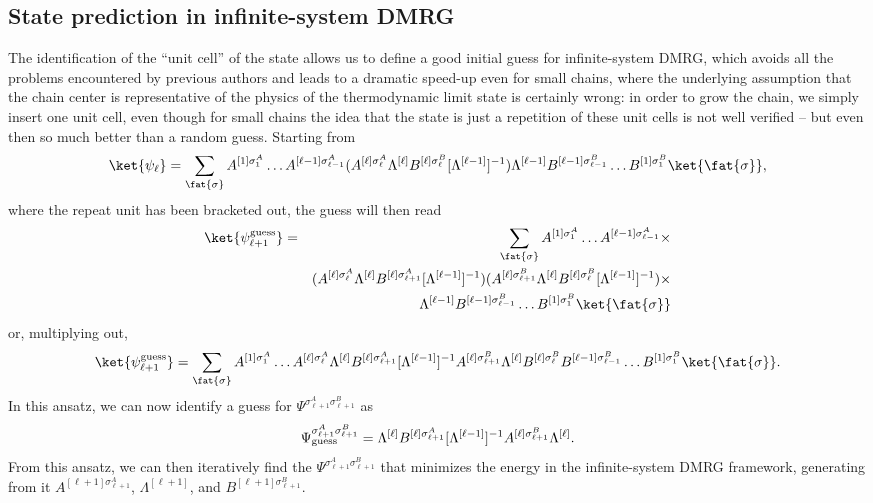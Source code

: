 \subsection{State prediction in infinite-system DMRG} 
The identification of the ``unit cell'' of the state allows us to define a good initial guess for infinite-system DMRG\cite{McCulloch08}, which avoids all the problems encountered by previous authors and leads to a dramatic speed-up even for small chains, where the underlying assumption that the chain center is representative of the physics of the thermodynamic limit state is certainly wrong: in order to grow the chain, we simply insert one unit cell, even though for small chains the idea that the state is just a repetition of these unit cells is not well verified -- but even then so much better than a random guess. Starting from
\begin{equation}
\ket{\psi_{\ell}} =  \sum_{\fat{\sigma}} A^{[1]\sigma_1^A} \ldots A^{[\ell-1]\sigma_{\ell-1}^A} (A^{[\ell]\sigma_\ell^A} \Lambda^{[\ell]} B^{[\ell]\sigma_\ell^B} [\Lambda^{[\ell-1]}]^{-1}) \Lambda^{[\ell-1]} B^{[\ell-1]\sigma_{\ell-1}^B} \ldots B^{[1]\sigma_1^B} \ket{\fat{\sigma}},
\end{equation} 
where the repeat unit has been bracketed out, the guess will then read
\begin{eqnarray}
\ket{\psi_{\ell+1}^{{\rm guess}}} &=& \sum_{\fat{\sigma}} A^{[1]\sigma_1^A} \ldots  A^{[\ell-1]\sigma_{\ell-1}^A} \times \nonumber \\
& & ( A^{[\ell]\sigma_\ell^A} \Lambda^{[\ell]} B^{[\ell]\sigma_{\ell+1}^A} [\Lambda^{[\ell-1]}]^{-1} ) (A^{[\ell]\sigma_{\ell+1}^B} \Lambda^{[\ell]} B^{[\ell]\sigma_\ell^B}  
[\Lambda^{[\ell-1]}]^{-1} ) \times \nonumber \\
& &  \Lambda^{[\ell-1]} B^{[\ell-1]\sigma_{\ell-1}^B} \ldots B^{[1]\sigma_1^B} \ket{\fat{\sigma}} 
\end{eqnarray}
or, multiplying out, 
\begin{equation}
\ket{\psi_{\ell+1}^{{\rm guess}}} = \sum_{\fat{\sigma}} A^{[1]\sigma_1^A} \ldots A^{[\ell]\sigma_\ell^A} \Lambda^{[\ell]} B^{[\ell]\sigma_{\ell+1}^A} [\Lambda^{[\ell-1]}]^{-1} A^{[\ell]\sigma_{\ell+1}^B} \Lambda^{[\ell]} B^{[\ell]\sigma_\ell^B} B^{[\ell-1]\sigma_{\ell-1}^B} \ldots B^{[1]\sigma_1^B} \ket{\fat{\sigma}} .
\end{equation}
In this ansatz, we can now identify a guess for $\Psi^{\sigma_{\ell+1}^A\sigma_{\ell+1}^B}$ as
\begin{equation}
\Psi^{\sigma_{\ell+1}^A\sigma_{\ell+1}^B}_{{\rm guess}} =
\Lambda^{[\ell]} B^{[\ell]\sigma_{\ell+1}^A} [\Lambda^{[\ell-1]}]^{-1} A^{[\ell]\sigma_{\ell+1}^B} \Lambda^{[\ell]} .
\label{eq:guess2sites}
\end{equation}
From this ansatz, we can then iteratively find the $\Psi^{\sigma_{\ell+1}^A\sigma_{\ell+1}^B}$ that minimizes the energy in the infinite-system DMRG framework, generating from it $A^{[\ell+1]\sigma_{\ell+1}^A}$, $\Lambda^{[\ell+1]}$, and $B^{[\ell+1]\sigma_{\ell+1}^B}$.

